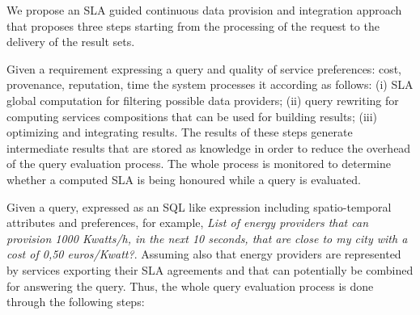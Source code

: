 We propose an SLA guided continuous data provision and integration approach that proposes three steps  starting from the processing of the request  to the delivery of the result sets.

Given a requirement expressing a query and quality of service preferences: cost, provenance, reputation, time the system processes it according as follows: (i) SLA global computation for filtering possible data providers; (ii) query rewriting for computing services compositions that can be used for building results; (iii) optimizing and integrating results. The results of these steps generate intermediate results that are stored as knowledge in order to reduce the overhead of the query evaluation process. The whole process is monitored to determine whether a computed SLA is being honoured while a query is evaluated. 

 Given a query, expressed as an SQL like expression including spatio-temporal attributes and preferences, for example, {\em List of energy providers that can provision 1000 Kwatts/h, in the next 10 seconds, that are close to my city with a cost of 0,50 euros/Kwatt?}. Assuming also that energy providers are represented by services exporting their SLA agreements and that can potentially be combined for answering the query. Thus, the whole query evaluation process is done through the following steps:



